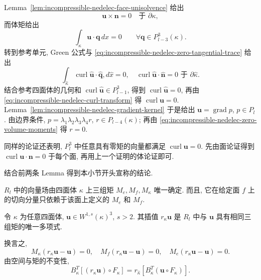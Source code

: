 \begin{Proof}
Lemma~\ref{lem:incompressible-nedelec-face-unisolvence} 给出
\begin{equation}\label{eq:incompressible-nedelec-zero-tangential-trace}
\mathbf u\times\mathbf n=0\quad\text{于 }\partial\kappa,
\end{equation}
而体矩给出
\begin{equation}\label{eq:incompressible-nedelec-zero-volume-moments}
\int_\kappa\mathbf u\cdot\mathbf q\,dx=0
\qquad\forall\mathbf q\in P_{l-3}^3(\kappa).
\end{equation}
转到参考单元, Green 公式与
\eqref{eq:incompressible-nedelec-zero-tangential-trace} 给出
\[
\int_{\widehat\kappa}
\operatorname{curl}\widehat{\mathbf u}\cdot\widehat{\mathbf q},d\widehat x=0,
\quad
\operatorname{curl}\widehat{\mathbf u}\cdot\widehat{\mathbf n}=0
\text{ 于 }\partial\widehat\kappa.
\]
结合参考四面体的几何和
$\operatorname{curl}\widehat{\mathbf u}\in P_{l-1}^3$,
得到 $\operatorname{curl}\widehat{\mathbf u}=0$,
再由 \eqref{eq:incompressible-nedelec-curl-transform}
得 $\operatorname{curl}\mathbf u=0$.
Lemma~\ref{lem:incompressible-nedelec-gradient-kernel}
于是给出 $\mathbf u=\operatorname{grad}p$, $p\in P_l$.
由边界条件,
$p=\lambda_1\lambda_2\lambda_3\lambda_4r$,
$r\in P_{l-4}(\kappa)$; 再由
\eqref{eq:incompressible-nedelec-zero-volume-moments} 得 $r=0$.
\end{Proof}

\begin{Remark}\label{rem:incompressible-nedelec-full-polynomial-curl-zero}
同样的论证还表明, $P_l^3$ 中任意具有零矩的向量都满足
$\operatorname{curl}\mathbf u=0$.
先由面论证得到 $\operatorname{curl}\mathbf u\cdot\mathbf n=0$
于每个面, 再用上一个证明的体论证即可.
\end{Remark}

结合前两条 Lemma 得到本小节开头宣称的结论.
\begin{Theorem}\label{thm:incompressible-nedelec-unisolvence}
$R_l$ 中的向量场由四面体 $\kappa$ 上三组矩
$M_e,M_f,M_\kappa$ 唯一确定.
而且, 它在给定面 $f$ 上的切向分量只依赖于该面上定义的
$M_e$ 和 $M_f$.
\end{Theorem}

\begin{Definition}\label{def:incompressible-nedelec-interpolant}
令 $\kappa$ 为任意四面体,
$\mathbf u\in W^{1,s}(\kappa)^3$, $s>2$.
其插值 $r_\kappa\mathbf u$ 是 $R_l$ 中与 $\mathbf u$
具有相同三组矩的唯一多项式.
\end{Definition}
换言之,
\[
M_\kappa(r_\kappa\mathbf u-\mathbf u)=0,
\quad M_f(r_\kappa\mathbf u-\mathbf u)=0,
\quad M_e(r_\kappa\mathbf u-\mathbf u)=0.
\]
由空间与矩的不变性,
\begin{equation}\label{eq:incompressible-nedelec-interpolation-commuting}
B_\kappa^T[(r_\kappa\mathbf u)\circ F_\kappa]
=r_{\widehat\kappa}[B_\kappa^T(\mathbf u\circ F_\kappa)].
\end{equation}

